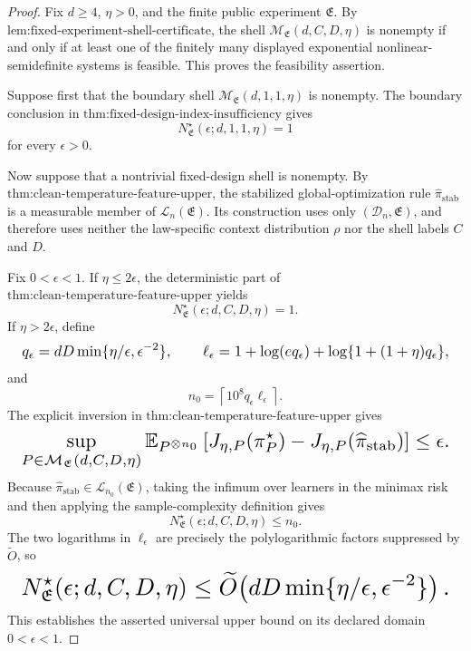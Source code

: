 \documentclass{article}
\begin{document}
\begin{proof}
Fix \(d\ge4\), \(\eta>0\), and the finite public experiment \(\mathfrak E\). By \(\text{lem:fixed-experiment-shell-certificate}\), the shell \(\mathcal M_{\mathfrak E}(d,C,D,\eta)\) is nonempty if and only if at least one of the finitely many displayed exponential nonlinear-semidefinite systems is feasible. This proves the feasibility assertion.

Suppose first that the boundary shell \(\mathcal M_{\mathfrak E}(d,1,1,\eta)\) is nonempty. The boundary conclusion in \(\text{thm:fixed-design-index-insufficiency}\) gives
\[
N^\star_{\mathfrak E}(\epsilon;d,1,1,\eta)=1
\]
for every \(\epsilon>0\).

Now suppose that a nontrivial fixed-design shell is nonempty. By \(\text{thm:clean-temperature-feature-upper}\), the stabilized global-optimization rule \(\widehat\pi_{\mathrm{stab}}\) is a measurable member of \(\mathcal L_n(\mathfrak E)\). Its construction uses only \((\mathcal D_n,\mathfrak E)\), and therefore uses neither the law-specific context distribution \(\rho\) nor the shell labels \(C\) and \(D\).

Fix \(0<\epsilon<1\). If \(\eta\le2\epsilon\), the deterministic part of \(\text{thm:clean-temperature-feature-upper}\) yields
\[
N^\star_{\mathfrak E}(\epsilon;d,C,D,\eta)=1.
\]
If \(\eta>2\epsilon\), define
\[
\makebox[\linewidth][c]{\resizebox{0.98\linewidth}{!}{\(\displaystyle q_\epsilon=dD\min\{\eta/\epsilon,\epsilon^{-2}\},
\qquad
\ell_\epsilon=1+\log(eq_\epsilon)+\log\{1+(1+\eta)q_\epsilon\},\)}}
\]
and
\[
n_0=\left\lceil10^8q_\epsilon\ell_\epsilon\right\rceil.
\]
The explicit inversion in \(\text{thm:clean-temperature-feature-upper}\) gives
\[
\makebox[\linewidth][c]{\resizebox{0.98\linewidth}{!}{\(\displaystyle \sup_{P\in\mathcal M_{\mathfrak E}(d,C,D,\eta)}
\mathbb E_{P^{\otimes n_0}}
\left[J_{\eta,P}(\pi_P^\star)-J_{\eta,P}(\widehat\pi_{\mathrm{stab}})\right]
\le\epsilon.\)}}
\]
Because \(\widehat\pi_{\mathrm{stab}}\in\mathcal L_{n_0}(\mathfrak E)\), taking the infimum over learners in the minimax risk and then applying the sample-complexity definition gives
\[
N^\star_{\mathfrak E}(\epsilon;d,C,D,\eta)
\le n_0.
\]
The two logarithms in \(\ell_\epsilon\) are precisely the polylogarithmic factors suppressed by \(\widetilde O\), so
\[
\makebox[\linewidth][c]{\resizebox{0.98\linewidth}{!}{\(\displaystyle N^\star_{\mathfrak E}(\epsilon;d,C,D,\eta)
\le\widetilde O\!\left(dD\min\{\eta/\epsilon,\epsilon^{-2}\}\right).\)}}
\]
This establishes the asserted universal upper bound on its declared domain \(0<\epsilon<1\).


\end{proof}
\end{document}
